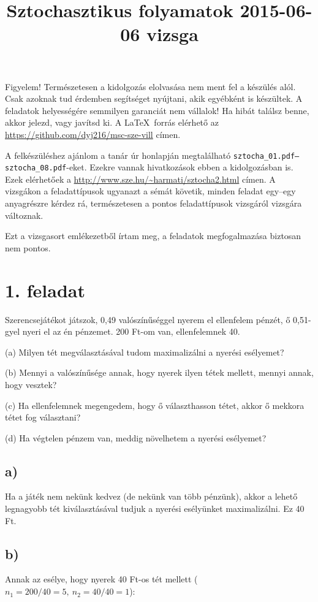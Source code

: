 \documentclass[a4paper,12pt]{article}
\title{Sztochasztikus folyamatok 2015-06-06 vizsga}
\begin{document}
\maketitle

Figyelem! Természetesen a kidolgozás elolvasása nem ment fel a készülés
alól. Csak azoknak tud érdemben segítséget nyújtani, akik egyébként is
készültek. A feladatok helyességére semmilyen garanciát nem vállalok!
Ha hibát találsz benne, akkor jelezd, vagy javítsd ki. A \LaTeX\ forrás
elérhető az \url{https://github.com/dyj216/msc-sze-vill} címen.

A felkészüléshez ajánlom a tanár úr honlapján megtalálható 
\texttt{\mbox{sztocha\_01.pdf}--\mbox{sztocha\_08.pdf}}-eket. Ezekre vannak hivatkozások 
ebben a kidolgozásban is. Ezek elérhetőek a 
\url{http://www.sze.hu/~harmati/sztocha2.html} címen. A vizsgákon a 
feladattípusok ugyanazt a sémát követik, minden feladat egy--egy 
anyagrészre kérdez rá, természetesen a pontos feladattípusok vizsgáról
vizsgára változnak.

Ezt a vizsgasort emlékezetből írtam meg, a feladatok megfogalmazása
biztosan nem pontos.

\section*{1. feladat}
Szerencsejátékot játszok, 0,49 valószínűséggel nyerem el ellenfelem 
pénzét, ő 0,51-gyel nyeri el az én pénzemet. 200 Ft-om van,
ellenfelemnek 40.

(a) Milyen tét megválasztásával tudom maximalizálni a nyerési 
esélyemet?

(b) Mennyi a valószínűsége annak, hogy nyerek ilyen tétek mellett, 
mennyi annak, hogy vesztek?

(c) Ha ellenfelemnek megengedem, hogy ő választhasson tétet, 
akkor ő mekkora tétet fog választani?

(d) Ha végtelen pénzem van, meddig növelhetem a nyerési esélyemet?

\subsection*{a)}
Ha a játék nem nekünk kedvez (de nekünk van több pénzünk), akkor
a lehető legnagyobb tét kiválasztásával tudjuk a nyerési esélyünket
maximalizálni. Ez 40 Ft.

\subsection*{b)}
Annak az esélye, hogy nyerek 40 Ft-os tét mellett 
($n_1 = 200/40 = 5, \ n_2 = 40/40 = 1$):
\end{document}
